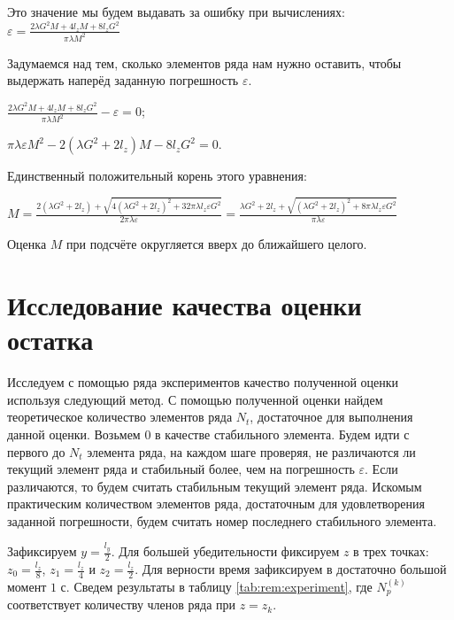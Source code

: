 Это значение мы будем выдавать за ошибку при вычислениях:\\
$\varepsilon = \frac{2 \lambda G^2 M + 4 l_z M + 8 l_z G^2}{\pi \lambda M^2}$

Задумаемся над тем, сколько элементов ряда нам нужно оставить, чтобы выдержать наперёд заданную погрешность $\varepsilon$.

$\frac{2 \lambda G^2 M + 4 l_z M + 8 l_z G^2}{\pi \lambda M^2} - \varepsilon = 0$;

$\pi \lambda \varepsilon M^2 - 2 \left( \lambda G^2 + 2 l_z \right) M - 8 l_z G^2 = 0$.

Единственный положительный корень этого уравнения:

$M = \frac{2 \left( \lambda G^2 + 2 l_z \right) + \sqrt{4 \left( \lambda G^2 + 2 l_z \right)^2 + 32 \pi \lambda l_z \varepsilon G^2}}{2 \pi \lambda \varepsilon} =
\frac{\lambda G^2 + 2 l_z + \sqrt{\left( \lambda G^2 + 2 l_z \right)^2 + 8 \pi \lambda l_z \varepsilon G^2}}{\pi \lambda \varepsilon}$

Оценка $M$ при подсчёте округляется вверх до ближайшего целого.

\section{Исследование качества оценки остатка}
Исследуем с помощью ряда экспериментов качество полученной оценки используя следующий метод. С помощью полученной оценки найдем
теоретическое количество элементов ряда $N_t$, достаточное для выполнения данной оценки. Возьмем $0$ в качестве стабильного элемента. 
Будем идти с первого до $N_t$ элемента ряда, на каждом шаге проверяя, не различаются ли текущий элемент ряда и стабильный более, чем
на погрешность $\varepsilon$. Если различаются, то будем считать стабильным текущий элемент ряда. Искомым практическим количеством
элементов ряда, достаточным для удовлетворения заданной погрешности, будем считать номер последнего стабильного элемента.

Зафиксируем $y = \frac{l_y}{2}$. Для большей убедительности фиксируем $z$ в трех точках: $z_0 = \frac{l_z}{8}$, $z_1 = \frac{l_z}{4}$ 
и $z_2 = \frac{l_z}{2}$. Для верности время зафиксируем в достаточно большой момент $1$ с. Сведем результаты в таблицу 
\ref{tab:rem:experiment}, где $N_{p}^{(k)}$ соответствует количеству членов ряда при $z = z_k$.


